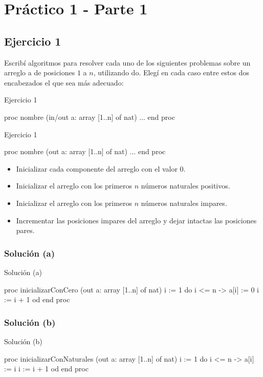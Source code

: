 \chapter{Práctico 1 - Parte 1}
\section{Ejercicio 1}
Escribí algoritmos para resolver cada uno de los siguientes problemas sobre un arreglo a de posiciones $1$ a $n$, utilizando do. Elegí en cada caso entre estos dos encabezados el que sea más adecuado:

\begin{codebox}{Ejercicio 1}
\begin{pascallike}
proc nombre (in/out a: array [1..n] of nat)
    ...
end proc
\end{pascallike}
\end{codebox}
\begin{codebox}{Ejercicio 1}
\begin{pascallike}
proc nombre (out a: array [1..n] of nat)
    ...
end proc
\end{pascallike}
\end{codebox}
\begin{itemize}
    \item[(a)] Inicializar cada componente del arreglo con el valor $0$.
    \item[(b)] Inicializar el arreglo con los primeros $n$ números naturales positivos.
    \item[(c)] Inicializar el arreglo con los primeros $n$ números naturales impares.
    \item[(d)] Incrementar las posiciones impares del arreglo y dejar intactas las posiciones pares.  
\end{itemize}

\subsection{Solución (a)}
\begin{codebox}{Solución (a)}
\begin{pascallike}
proc inicializarConCero (out a: array [1..n] of nat)
    i := 1
    do i <= n -> 
    a[i] := 0
    i := i + 1
    od
end proc
\end{pascallike}
\end{codebox}

\subsection{Solución (b)}
\begin{codebox}{Solución (b)}
\begin{pascallike}
proc inicializarConNaturales (out a: array [1..n] of nat)
    i := 1
    do i <= n -> 
    a[i] := i
    i := i + 1
    od
end proc
\end{pascallike}
\end{codebox}

